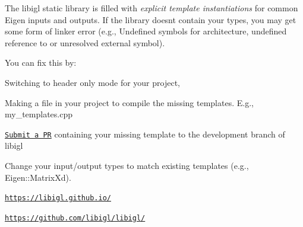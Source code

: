 The libigl static library is filled with {\itshape explicit template instantiations} for common Eigen inputs and outputs. If the library doesn\textquotesingle{}t contain your types, you may get some form of linker error (e.\+g., {\ttfamily Undefined symbols for architecture}, {\ttfamily undefined reference to} or {\ttfamily unresolved external symbol}).

You can fix this by:\+


\begin{DoxyEnumerate}
\item Switching to header only mode for your project,
\item Making a file in your project to compile the missing templates. E.\+g., {\ttfamily my\+\_\+templates.\+cpp} 
\begin{DoxyCode}{0}
\DoxyCodeLine{\textcolor{preprocessor}{\#ifdef\ IGL\_STATIC\_LIBRARY}}
\DoxyCodeLine{\textcolor{preprocessor}{\#undef\ IGL\_STATIC\_LIBRARY}}
\DoxyCodeLine{\textcolor{preprocessor}{\#endif}}

\end{DoxyCode}

\item \href{https://github.com/libigl/libigl/pulls}{\texttt{Submit a PR}} containing your missing template to the development branch of libigl
\item Change your input/\+output types to match existing templates (e.\+g., {\ttfamily Eigen::\+\+Matrix\+Xd}).
\end{DoxyEnumerate}

\href{https://libigl.github.io/}{\texttt{https:\+/\+/\+libigl.\+github.\+io/\+}}

\href{https://github.com/libigl/libigl/}{\texttt{https:\+/\+/\+github.\+com/\+libigl/\+libigl/\+}} 